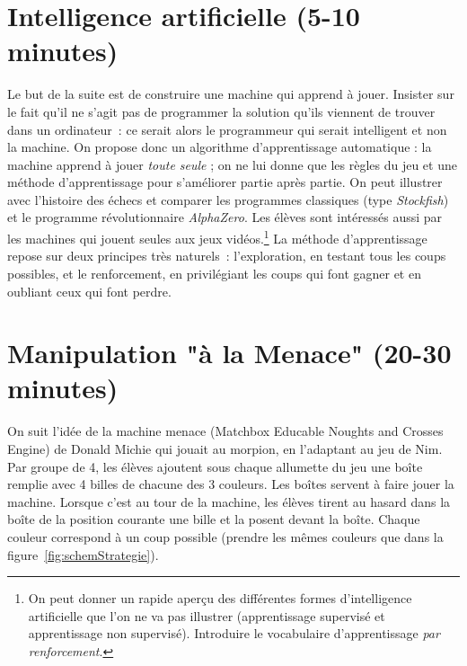 \documentclass[a4paper,12pt]{article}
\begin{document}
\section{Intelligence artificielle (5-10 minutes)} \label{intelligence-artificielle-5-10-minutes}
\noindent Le but de la suite est de construire une machine qui apprend à jouer. Insister sur le fait qu'il ne s'agit pas de
programmer la solution qu'ils viennent de trouver dans un ordinateur~: ce serait alors le programmeur qui serait
intelligent et non la machine. On propose donc un algorithme d'apprentissage automatique : la machine apprend à jouer
\emph{toute seule} ; on ne lui donne que les règles du jeu et une méthode d'apprentissage pour s'améliorer partie après
partie. On peut illustrer avec l'histoire des échecs et comparer les programmes classiques (type \emph{Stockfish}) et le
programme révolutionnaire \emph{AlphaZero}. Les élèves sont intéressés aussi par les machines qui jouent seules aux jeux
vidéos.\footnote{On peut donner un rapide aperçu des différentes formes d'intelligence artificielle que l'on ne va pas
illustrer (apprentissage supervisé et apprentissage non supervisé). Introduire le vocabulaire d'apprentissage \emph{par renforcement}.}
%
La méthode d'apprentissage repose sur deux principes très naturels~: l'exploration, en testant tous les coups possibles, et le renforcement, en privilégiant les coups qui font gagner et en oubliant ceux qui font perdre.

\section{Manipulation "à la Menace" (20-30 minutes)}
\label{manipulation-uxe0-la-menace-20-30-minutes}
\noindent On suit l'idée de la machine {\sc menace} (Matchbox Educable Noughts and Crosses Engine) 
de Donald Michie \cite{Wiki, Michie} qui jouait au morpion, en l'adaptant au jeu de Nim.
%
Par groupe de 4, les élèves ajoutent sous chaque allumette du jeu une boîte remplie avec 4 billes de chacune des 3 couleurs. Les boîtes servent à faire jouer la machine. Lorsque c'est au tour de la machine, les élèves tirent au hasard dans la boîte de la position courante une bille et la posent devant la boîte. Chaque couleur correspond à un coup possible (prendre les mêmes couleurs que dans la figure~\ref{fig:schemStrategie}).
\end{document}
